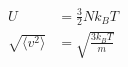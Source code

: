

\vspace*{\fill}
\centering

\begin{align*}
    U &= \frac{3}{2}Nk_{B}T \\
    \sqrt{\langle v^2 \rangle} &= \sqrt{\frac{3k_{B}T}{m}}
\end{align*}

\centering
\vspace*{\fill}

